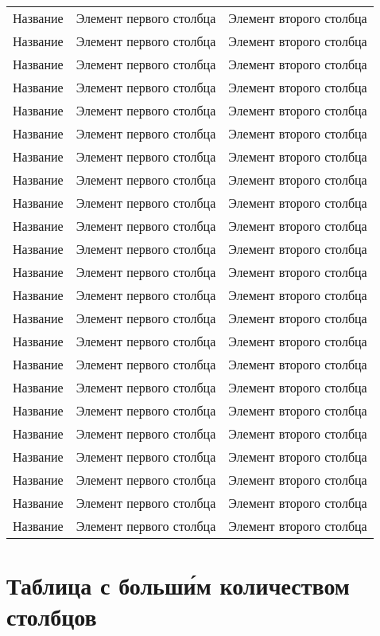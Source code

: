 \begin{longtable}{|l|c|c|}
Название & Элемент первого столбца & Элемент второго столбца \\
Название & Элемент первого столбца & Элемент второго столбца \\
Название & Элемент первого столбца & Элемент второго столбца \\
Название & Элемент первого столбца & Элемент второго столбца \\
Название & Элемент первого столбца & Элемент второго столбца \\
Название & Элемент первого столбца & Элемент второго столбца \\
Название & Элемент первого столбца & Элемент второго столбца \\
Название & Элемент первого столбца & Элемент второго столбца \\
Название & Элемент первого столбца & Элемент второго столбца \\
Название & Элемент первого столбца & Элемент второго столбца \\
Название & Элемент первого столбца & Элемент второго столбца \\
Название & Элемент первого столбца & Элемент второго столбца \\
Название & Элемент первого столбца & Элемент второго столбца \\
Название & Элемент первого столбца & Элемент второго столбца \\
Название & Элемент первого столбца & Элемент второго столбца \\
Название & Элемент первого столбца & Элемент второго столбца \\
Название & Элемент первого столбца & Элемент второго столбца \\
Название & Элемент первого столбца & Элемент второго столбца \\
Название & Элемент первого столбца & Элемент второго столбца \\
Название & Элемент первого столбца & Элемент второго столбца \\
Название & Элемент первого столбца & Элемент второго столбца \\
Название & Элемент первого столбца & Элемент второго столбца \\
Название & Элемент первого столбца & Элемент второго столбца \\
\end{longtable}

\chapter{Таблица с больш\'{и}м количеством столбцов}
\label{app:gtable}

